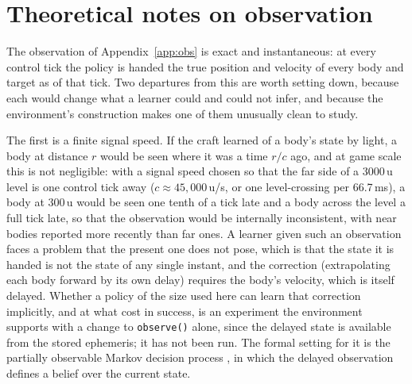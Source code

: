 \documentclass[11pt]{article}
\newcommand{\code}[1]{\texttt{\small #1}}
\begin{document}
\appendix

\section{Theoretical notes on observation}
\label{app:theory}

The observation of Appendix~\ref{app:obs} is exact and instantaneous: at
every control tick the policy is handed the true position and velocity of
every body and target as of that tick. Two departures from this are worth
setting down, because each would change what a learner could and could not
infer, and because the environment's construction makes one of them
unusually clean to study.

The first is a finite signal speed. If the craft learned of a body's state
by light, a body at distance $r$ would be seen where it was a time $r/c$
ago, and at game scale this is not negligible: with a signal speed chosen so
that the far side of a 3000\,u level is one control tick away ($c \approx
45{,}000$\,u/s, or one level-crossing per 66.7\,ms), a body at 300\,u would
be seen one tenth of a tick late and a body across the level a full tick
late, so that the observation would be internally inconsistent, with near
bodies reported more recently than far ones. A learner given such an
observation faces a problem that the present one does not pose, which is
that the state it is handed is not the state of any single instant, and the
correction (extrapolating each body forward by its own delay) requires the
body's velocity, which is itself delayed. Whether a policy of the size used
here can learn that correction implicitly, and at what cost in success, is
an experiment the environment supports with a change to \code{observe()}
alone, since the delayed state is available from the stored ephemeris; it
has not been run. The formal setting for it is the partially observable
Markov decision process \cite{kaelbling1998}, in which the delayed
observation defines a belief over the current state.
\end{document}
